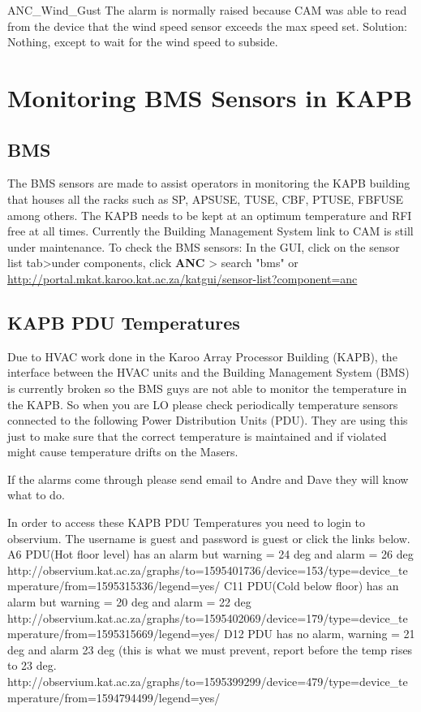 ANC\_Wind\_Gust
The alarm is normally raised because CAM was able to read from the device that the wind speed sensor exceeds the max speed set.
Solution: Nothing, except to wait for the wind speed to subside.




\section{ Monitoring BMS Sensors in KAPB}
\subsection{ BMS} 
The BMS sensors are made to assist operators in monitoring the KAPB building that houses all the racks  such as SP, APSUSE, TUSE, CBF, PTUSE, FBFUSE among others. The KAPB needs to be kept at an optimum temperature and RFI free at all times. 
Currently the Building Management System  link to CAM is still under maintenance. 
To check the BMS sensors:
In the GUI, click on the sensor list tab>under components, click \textbf{ANC} > search "bms" or 
\url{http://portal.mkat.karoo.kat.ac.za/katgui/sensor-list?component=anc}
\subsection{ KAPB PDU Temperatures}
Due to HVAC work done in the Karoo Array Processor Building (KAPB), the interface between the HVAC units and the Building Management System (BMS) is currently broken so the BMS guys are not able to monitor the temperature in the KAPB.  So when you are LO please check periodically temperature sensors connected to the following Power Distribution Units (PDU). They are using this just to make sure that the correct temperature is maintained and if violated might cause temperature drifts on the Masers.

If the alarms come through please send email to Andre and Dave they will know what to do.

In order to access these KAPB PDU Temperatures you need to login to observium.
The username is guest and password is guest or click the links below.
A6 PDU(Hot floor level) has an alarm but warning = 24 deg and alarm = 26 deg http://observium.kat.ac.za/graphs/to=1595401736/device=153/type=device\_temperature/from=1595315336/legend=yes/
C11 PDU(Cold below floor) has an alarm but warning = 20 deg and alarm = 22 deg
http://observium.kat.ac.za/graphs/to=1595402069/device=179/type=device\_temperature/from=1595315669/legend=yes/
D12 PDU has no alarm, warning = 21 deg and alarm 23 deg (this is what we must prevent, report before the temp rises to 23 deg. 
http://observium.kat.ac.za/graphs/to=1595399299/device=479/type=device\_temperature/from=1594794499/legend=yes/

